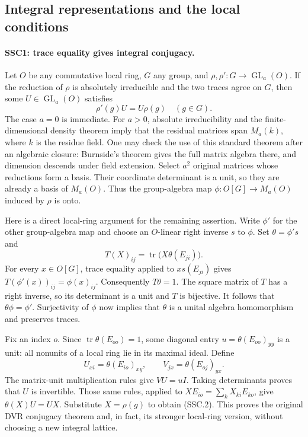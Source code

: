 \documentclass[11pt,a4paper]{article}
\numberwithin{equation}{section}
\theoremstyle{remark}\newtheorem{remark}[theorem]{Remark}
\begin{document}
\subsection{Integral representations and the local conditions}

\paragraph{SSC1: trace equality gives integral conjugacy.}
\label{claim:SSC1}
Let $O$ be any commutative local ring, $G$ any group, and
$\rho,\rho':G\to\operatorname{GL}_a(O)$. If the reduction of
$\rho$ is absolutely irreducible and the two traces agree on $G$,
then some $U\in\operatorname{GL}_a(O)$ satisfies
\[
                    \rho'(g)U=U\rho(g)\quad(g\in G).             \tag{SSC.2}
\]
The case $a=0$ is immediate. For $a>0$, absolute irreducibility
and the finite-dimensional density theorem imply that the residual
matrices span $M_a(k)$, where $k$ is the residue field. One may
check the use of this standard theorem after an algebraic closure:
Burnside's theorem gives the full matrix algebra there, and dimension
descends under field extension. Select $a^2$ original matrices whose
reductions form a basis. Their coordinate determinant is a unit, so
they are already a basis of $M_a(O)$. Thus the group-algebra map
$\phi:O[G]\to M_a(O)$ induced by $\rho$ is onto.

Here is a direct local-ring argument for the remaining assertion.
Write $\phi'$ for the other group-algebra map and choose an
$O$-linear right inverse $s$ to $\phi$. Set $\theta=\phi's$ and
\[
 T(X)_{ij}=\operatorname{tr}\bigl(X\theta(E_{ji})\bigr).
\]
For every $x\in O[G]$, trace equality applied to $xs(E_{ji})$
gives $T(\phi'(x))_{ij}=\phi(x)_{ij}$. Consequently
$T\theta=1$. The square matrix of $T$ has a right inverse,
so its determinant is a unit and $T$ is bijective. It follows that
$\theta\phi=\phi'$. Surjectivity of $\phi$ now implies that
$\theta$ is a unital algebra homomorphism and preserves traces.

Fix an index $o$. Since $\operatorname{tr}\theta(E_{oo})=1$,
some diagonal entry $u=\theta(E_{oo})_{yy}$ is a unit: all
nonunits of a local ring lie in its maximal ideal. Define
\[
 U_{xi}=\theta(E_{io})_{xy},\qquad
 V_{jx}=\theta(E_{oj})_{yx}.
\]
The matrix-unit multiplication rules give $VU=uI$. Taking
determinants proves that $U$ is invertible. Those same rules,
applied to $XE_{io}=\sum_k X_{ki}E_{ko}$, give
$\theta(X)U=UX$. Substitute $X=\rho(g)$ to obtain (SSC.2).
This proves the original DVR conjugacy theorem and, in fact, its
stronger local-ring version, without choosing a new integral lattice.
\end{document}
